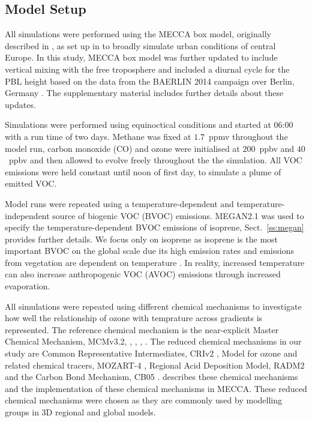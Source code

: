 \subsection{Model Setup} \label{ss:model_setup}
All simulations were performed using the MECCA box model, originally described in \citet{Sander:2005}, as set up in \citet{Coates:2015} to broadly simulate urban conditions of central Europe.
In this study, MECCA box model was further updated to include vertical mixing with the free troposphere and included a diurnal cycle for the PBL height based on the data from the BAERLIN 2014 campaign over Berlin, Germany \citep{Bonn:2016}. 
The supplementary material includes further details about these updates.

Simulations were performed using equinoctical conditions and started at 06:00 with a run time of two days.
Methane was fixed at $1.7$~ppmv throughout the model run, carbon monoxide (CO) and ozone were initialised at $200$~ppbv and $40$~ppbv and then allowed to evolve freely throughout the the simulation.
All VOC emissions were held constant until noon of first day, to simulate a plume of emitted VOC.

Model runs were repeated using a temperature-dependent and temperature-independent source of biogenic VOC (BVOC) emissions. 
MEGAN2.1 \citep{Guenther:2012} was used to specify the temperature-dependent BVOC emissions of isoprene, Sect.~\ref{ss:megan} provides further details. 
We focus only on isoprene as isoprene is the most important BVOC on the global scale due its high emission rates and emissions from vegetation are dependent on temperature \citep{Guenther:2006}. 
In reality, increased temperature can also increase anthropogenic VOC (AVOC) emissions through increased evaporation.

All simulations were repeated using different chemical mechanisms to investigate how well the relationship of ozone with temprature across  gradients is represented.
The reference chemical mechanism is the near-explicit Master Chemical Mechanism, MCMv3.2, \citep{Jenkin:1997}, \citep{Jenkin:2003}, \citep{Saunders:2003}, \citep{MCM_Site}.
The reduced chemical mechanisms in our study are Common Representative Intermediates, CRIv2 \citep{Jenkin:2008}, Model for ozone and related chemical tracers, MOZART-4 \citep{Emmons:2010}, Regional Acid Deposition Model, RADM2 \citep{Stockwell:1990} and the Carbon Bond Mechanism, CB05 \citep{Yarwood:2005}. 
\citet{Coates:2015} describes these chemical mechanisms and the implementation of these chemical mechanisms in MECCA.
These reduced chemical mechanisms were chosen as they are commonly used by modelling groups in 3D regional and global models.

